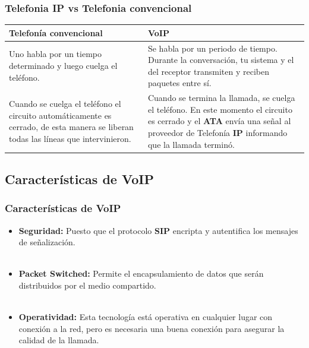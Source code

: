 \documentclass{beamer}
\begin{document}
	\begin{frame}
	\frametitle{Telefonia IP vs Telefonia convencional}
		\begin{tabular}{|p{5.5cm}|p{5.5cm}|}
					\hline
			\textbf{Telefonía convencional} & \textbf{VoIP} \\
			\hline \hline
			Uno habla por un tiempo determinado y luego cuelga el teléfono. & Se habla por un periodo de tiempo. Durante la conversación, tu sistema y el del receptor transmiten y reciben paquetes entre sí. \\
			\hline
			Cuando se cuelga el teléfono el circuito automáticamente es cerrado, de esta manera se liberan todas las líneas que intervinieron. & Cuando se termina la llamada, se cuelga el teléfono. En este momento el circuito es cerrado y el \textbf{ATA} envía una señal al proveedor de Telefonía \textbf{IP} informando que la llamada terminó. \\
			\hline
		\end{tabular}
	\end{frame}
	
	\subsection{Características de VoIP}
	\begin{frame}
	\frametitle{Características de VoIP}
		\begin{itemize}
			\item \textbf{Seguridad:} Puesto que el protocolo \textbf{SIP} encripta y autentifica los mensajes de señalización.\\~\\
			\item \textbf{Packet Switched:} Permite el encapsulamiento de datos que serán distribuidos por el medio compartido.\\~\\
			\item \textbf{Operatividad:} Esta tecnología está operativa en cualquier lugar con conexión a la red, pero es necesaria una buena conexión para asegurar la calidad de la llamada.
		\end{itemize}
	\end{frame}	
	
\end{document}
